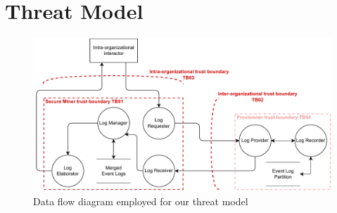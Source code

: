 \section{Threat Model}
\label{sec:thretmodel}
\begin{figure}
    \centering
    \includegraphics[width=0.95\linewidth]{content//figures/threatmodel.pdf}
    \caption{Data flow diagram employed for our threat model}
    \label{fig:threatmodel:dataflow}
\end{figure}
